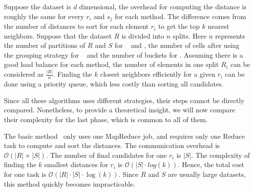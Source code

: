 
Suppose the dataset is $d$ dimensional, the overhead for computing the distance is roughly the same for every $r_i$ and 
$s_j$ for each method. The difference comes from the number of distances to 
sort for each element $r_i$ to get the top $k$ nearest neighbors. Suppose that the dataset $R$ is divided into $n$ splits. 
Here $n$ represents the number of partitions of $R$ and $S$ for \HBNLJ~ and \Z, the number of cells after using the 
grouping strategy for \VO~ and the number of buckets for \LSH. %
Assuming there is a good load balance for each method, the number of elements in one split $R_i$ can be 
considered as $\frac{\left|R\right|}{n}$. Finding the $k$ closest neighbors efficiently for a given $r_i$ can be done using 
a priority queue, which less costly than sorting all candidates.

Since all these algorithms uses different strategies, their steps cannot be directly compared. Nonetheless,
to provide a theoretical insight, we will now compare their complexity for the last phase, which is common to all of 
them. 

The basic method \HBK~only uses one MapReduce job, and requires  
only one Reduce task to compute and sort the distances. The communication overhead is $\mathcal{O} 
(\left|R\right|+\left|S\right|)$. The number of final candidates for one $r_i$ is $|S|$. The complexity of finding the 
$k$ smallest distances for $r_i$ is $\mathcal{O}(
\left|S\right| \cdot log\left(k\right))$. Hence, the total cost for one task is $\mathcal{O}(\left|R\right| 
\cdot \left|S\right| \cdot \log\left(k\right))$. Since $R$ and $S$ are usually large 
datasets, this method quickly becomes impracticable.

